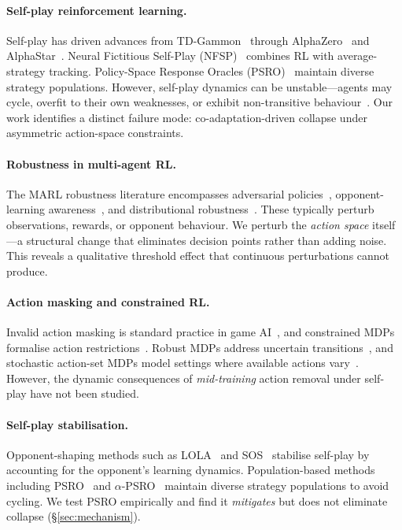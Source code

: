 \documentclass{article}
\begin{document}
\paragraph{Self-play reinforcement learning.}
Self-play has driven advances from TD-Gammon~\citep{tesauro1994td} through AlphaZero~\citep{silver2018general} and AlphaStar~\citep{vinyals2019grandmaster}. Neural Fictitious Self-Play (NFSP)~\citep{heinrich2016deep} combines RL with average-strategy tracking. Policy-Space Response Oracles (PSRO)~\citep{lanctot2017unified} maintain diverse strategy populations. However, self-play dynamics can be unstable---agents may cycle, overfit to their own weaknesses, or exhibit non-transitive behaviour~\citep{balduzzi2019open,lanctot2019openspiel}. Our work identifies a distinct failure mode: co-adaptation-driven collapse under asymmetric action-space constraints.

\paragraph{Robustness in multi-agent RL.}
The MARL robustness literature encompasses adversarial policies~\citep{gleave2020adversarial}, opponent-learning awareness~\citep{foerster2018learning}, and distributional robustness~\citep{zhang2021multi}. These typically perturb observations, rewards, or opponent behaviour. We perturb the \emph{action space} itself---a structural change that eliminates decision points rather than adding noise. This reveals a qualitative threshold effect that continuous perturbations cannot produce.

\paragraph{Action masking and constrained RL.}
Invalid action masking is standard practice in game AI~\citep{huang2022closer}, and constrained MDPs formalise action restrictions~\citep{altman1999constrained}. Robust MDPs address uncertain transitions~\citep{iyengar2005robust,nilim2005robust}, and stochastic action-set MDPs model settings where available actions vary~\citep{boutilier2018planning}. However, the dynamic consequences of \emph{mid-training} action removal under self-play have not been studied.

\paragraph{Self-play stabilisation.}
Opponent-shaping methods such as LOLA~\citep{foerster2018learning} and SOS~\citep{letcher2019stable} stabilise self-play by accounting for the opponent's learning dynamics. Population-based methods including PSRO~\citep{lanctot2017unified} and $\alpha$-PSRO~\citep{muller2020generalized} maintain diverse strategy populations to avoid cycling. We test PSRO empirically and find it \emph{mitigates} but does not eliminate collapse (\S\ref{sec:mechanism}).
\end{document}
